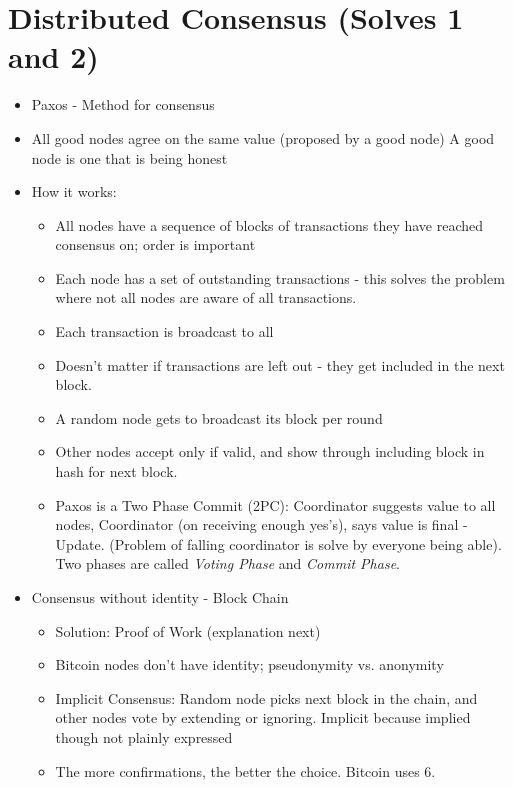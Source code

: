 \documentclass{article}
\begin{document}
\section*{Distributed Consensus (Solves 1 and 2)}
\begin{itemize}
  \item Paxos - Method for consensus
  \item All good nodes agree on the same value (proposed by a good node)
    \subitem A good node is one that is being honest
  \item How it works:
    \begin{itemize}
      \item All nodes have a sequence of blocks of transactions they have reached consensus on; order is important
      \item Each node has a set of outstanding transactions - this solves the problem where not all nodes are aware of all transactions.
      \item Each transaction is broadcast to all
      \item Doesn't matter if transactions are left out - they get included in the next block.
      \item A random node gets to broadcast its block per round
      \item Other nodes accept only if valid, and show through including block in hash for next block.
      \item Paxos is a Two Phase Commit (2PC): Coordinator suggests value to all nodes, Coordinator (on receiving enough
          yes's), says value is final - Update. (Problem of falling coordinator is solve by everyone being able).\\
        \subitem Two phases are called \emph{Voting Phase} and \emph{Commit Phase}.
    \end{itemize}
  \item Consensus without identity - Block Chain
    \begin{itemize}
      \item Solution: Proof of Work (explanation next)
      \item Bitcoin nodes don't have identity; pseudonymity vs. anonymity
      \item Implicit Consensus: Random node picks next block in the chain, and other nodes vote by extending or ignoring.
        \subitem Implicit because implied though not plainly expressed
      \item The more confirmations, the better the choice. Bitcoin uses 6.
    \end{itemize}
\end{itemize}
\end{document}
